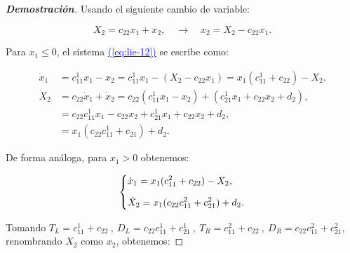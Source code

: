 \documentclass[12pt,a4paper]{report} %
\newcommand{\eref}[1]{\hyperref[#1]{\textcolor{blue}{(\ref*{#1})}}}
\begin{document}
	\vspace{0.5cm}\begin{proof}[\textbf{Demostración}]
	Usando el siguiente cambio de variable:
	
	\begin{equation}
		\label{eq:cambioo}
		X_2=c_{22}x_1+x_2,\quad \rightarrow \quad x_2=X_2-c_{22}x_1.
	\end{equation}\smallskip
	
	\noindent Para $x_1\leq 0$, el sistema \eref{eq:lie-12} se escribe como:
	
		\begin{equation}
		\label{eq:cambio2}
		\begin{aligned}
			\dot{x}_1&=c_{11}^1x_1-x_2=c_{11}^1x_1-(X_2-c_{22}x_1)=x_1(c_{11}^1+c_{22})-X_2. \\[2mm]
			\dot{X}_2&=c_{22}\dot{x}_1+\dot{x}_2=c_{22}(c_{11}^1x_1-x_2)+(c_{21}^1x_1+c_{22}x_2+d_2), \\[2mm]
			&=c_{22}c_{11}^1x_1-c_{22}x_2+c_{21}^1x_1+c_{22}x_2+d_2, \\[2mm]
			&=x_1(c_{22}c_{11}^1+c_{21})+d_2.
		\end{aligned}
		\end{equation}\smallskip
	
	\noindent De forma análoga, para $x_1>0$ obtenemos:
	
	\begin{equation}
		\label{eq:cambio22}
		\scalebox{1}{$\displaystyle
			\left\{
			\begin{aligned}
				&\dot{x}_1=x_1(c_{11}^2+c_{22})-X_2, \\[2mm]
				&\dot{X}_2=x_1(c_{22}c_{11}^2+c_{21}^2)+d_2.
			\end{aligned}
			\right.
			$}
	\end{equation}\smallskip
	
 	\noindent Tomando $T_L=c_{11}^1+c_{22} \: , \: D_L=c_{22}c_{11}^1+c_{21}^1 \: , \:  T_R=c_{11}^2+c_{22} \: , \: D_R=c_{22}c_{11}^2+c_{21}^2$, renombrando $X_2$ como $x_2$, obtenemos:
	

\end{proof}
\end{document}
